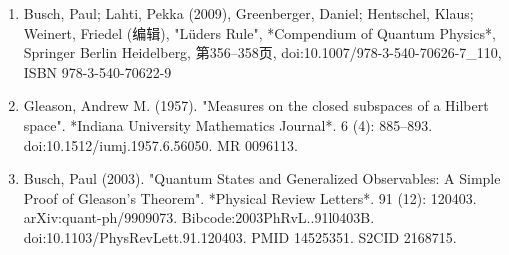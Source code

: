 \begin{enumerate}
\item Busch, Paul; Lahti, Pekka (2009), Greenberger, Daniel; Hentschel, Klaus; Weinert, Friedel (编辑), "Lüders Rule", *Compendium of Quantum Physics*, Springer Berlin Heidelberg, 第356–358页, doi:10.1007/978-3-540-70626-7_110, ISBN 978-3-540-70622-9  
\item Gleason, Andrew M. (1957). "Measures on the closed subspaces of a Hilbert space". *Indiana University Mathematics Journal*. 6 (4): 885–893. doi:10.1512/iumj.1957.6.56050. MR 0096113.  
\item Busch, Paul (2003). "Quantum States and Generalized Observables: A Simple Proof of Gleason's Theorem". *Physical Review Letters*. 91 (12): 120403. arXiv:quant-ph/9909073. Bibcode:2003PhRvL..91l0403B. doi:10.1103/PhysRevLett.91.120403. PMID 14525351. S2CID 2168715.
\end{enumerate}